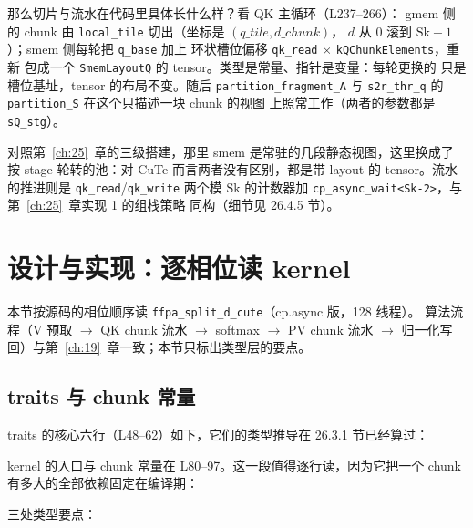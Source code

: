 那么切片与流水在代码里具体长什么样？看 QK 主循环（L237--266）：
gmem 侧的 chunk 由 \texttt{local\_tile} 切出（坐标是 $(q\_tile, d\_chunk)$，
$d$ 从 $0$ 滚到 $\mathrm{Sk}{-}1$）；smem 侧每轮把 \texttt{q\_base} 加上
环状槽位偏移 \texttt{qk\_read} $\times$ \texttt{k\allowbreak{}QChunk\allowbreak{}Elements}，重新
包成一个 \texttt{SmemLayoutQ} 的 tensor。类型是常量、指针是变量：每轮更换的
只是槽位基址，tensor 的布局不变。随后 \texttt{partition\_\allowbreak{}fragment\_\allowbreak{}A} 与
\texttt{s2r\_thr\_q} 的 \texttt{partition\_S} 在这个只描述一块 chunk 的视图
上照常工作（两者的参数都是 \texttt{sQ\_stg}）。

对照第~\ref{ch:25}~章的三级搭建，那里 smem 是常驻的几段静态视图，这里换成了
按 stage 轮转的池：对 CuTe 而言两者没有区别，都是带 layout 的 tensor。流水
的推进则是 \texttt{qk\_read}/\texttt{qk\_write} 两个模 $\mathrm{Sk}$ 的计数器加
\texttt{cp\_\allowbreak{}async\_\allowbreak{}wait\allowbreak{}<Sk-2>}，与第~\ref{ch:25}~章实现 1 的组栈策略
同构（细节见 26.4.5 节）。

\section{设计与实现：逐相位读 kernel}

本节按源码的相位顺序读 \texttt{ffpa\_\allowbreak{}split\_\allowbreak{}d\_\allowbreak{}cute}（cp.async 版，128 线程）。
算法流程（V 预取 $\to$ QK chunk 流水 $\to$ softmax $\to$ PV chunk 流水 $\to$
归一化写回）与第~\ref{ch:19}~章一致；本节只标出类型层的要点。

\subsection{traits 与 chunk 常量}

traits 的核心六行（L48--62）如下，它们的类型推导在 26.3.1 节已经算过：



kernel 的入口与 chunk 常量在 L80--97。这一段值得逐行读，因为它把一个
chunk 有多大的全部依赖固定在编译期：



三处类型要点：

